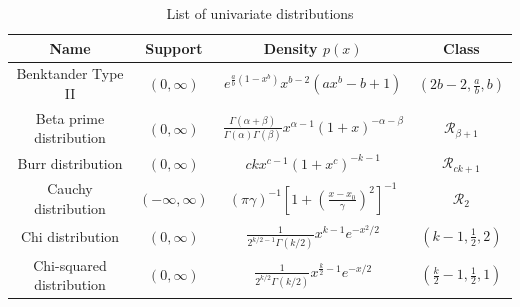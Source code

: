 \documentclass[../thesis.tex]{subfiles}
\begin{document}
  {\small
    \bgroup
    \def\arraystretch{2}
    \begin{longtable}{|c|c|c|c|}
      \caption{List of univariate distributions}\label{tab:dist_list}                                                                                                                                                                                                                                                                         \\
      \hline
      Name                                                                  & Support                                                 & Density $p(x)$                                                                                                                  & Class\tabularnewline
      \hline
      \hline
      Benktander Type II                                                    & $(0,\infty)$                                            & $e^{\frac{a}{b}(1-x^{b})}x^{b-2}(ax^{b}-b+1)$                                                                                   & $(2b-2,\frac{a}{b},b)$\tabularnewline
      \hline
      Beta prime distribution                                               & $(0,\infty)$                                            & $\frac{\Gamma(\alpha+\beta)}{\Gamma(\alpha)\Gamma(\beta)}x^{\alpha-1}(1+x)^{-\alpha-\beta}$                                     & $\mathcal{R}_{\beta+1}$\tabularnewline
      \hline
      Burr distribution                                                     & $(0,\infty)$                                            & $ckx^{c-1} (1+x^{c})^{-k-1}$                                                                                                    & $\mathcal{R}_{ck+1}$\tabularnewline
      \hline
      Cauchy distribution                                                   & $(-\infty,\infty)$                                      & $(\pi\gamma)^{-1}\left[1+\left(\frac{x-x_{0}}{\gamma}\right)^{2}\right]^{-1}$                                                   & $\mathcal{R}_{2}$\tabularnewline
      \hline
      Chi distribution                                                      & $(0,\infty)$                                            & $\frac{1}{2^{k/2-1}\Gamma(k/2)}x^{k-1}e^{-x^{2}/2}$                                                                             & $(k-1,\frac{1}{2},2)$\tabularnewline
      \hline
      Chi-squared distribution                                              & $(0,\infty)$                                            & $\frac{1}{2^{k/2}\Gamma(k/2)}x^{\frac{k}{2}-1}e^{-x/2}$                                                                         & $(\frac{k}{2}-1,\frac{1}{2},1)$\tabularnewline

\end{longtable}}
\end{document}
